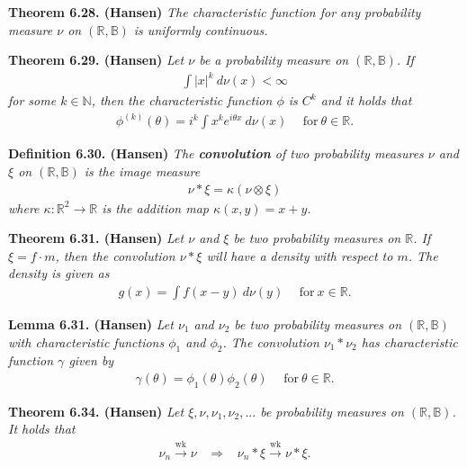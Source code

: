 \documentclass[a4paper,12pt,openany]{book}
\begin{document}
\textbf{Theorem 6.28. (Hansen)} \emph{The characteristic function for any probability measure \(\nu\) on \((\mathbb{R},\mathbb{B})\) is uniformly continuous.}

\textbf{Theorem 6.29. (Hansen)} \emph{Let \(\nu\) be a probability measure on \((\mathbb{R},\mathbb{B})\). If}
\begin{align*}
    \int \vert x\vert^k\ d\nu(x)<\infty
\end{align*}
\emph{for some \(k\in\mathbb{N}\), then the characteristic function \(\phi\) is \(C^k\) and it holds that}
\begin{align*}
    \phi^{(k)}(\theta)=i^k\int x^ke^{i\theta x}\ d\nu(x)\hspace{15pt}\text{for}\ \theta\in\mathbb{R}.\tag{6.31}
\end{align*}

\textbf{Definition 6.30. (Hansen)} \emph{The \textbf{convolution} of two probability measures \(\nu\) and \(\xi\) on \((\mathbb{R},\mathbb{B})\) is the image measure}
\begin{align*}
    \nu * \xi=\kappa (\nu\otimes\xi)\tag{6.33}
\end{align*}
\emph{where \(\kappa : \mathbb{R}^2\to\mathbb{R}\) is the addition map \(\kappa(x,y)=x+y\).}

\textbf{Theorem 6.31. (Hansen)} \emph{Let \(\nu\) and \(\xi\) be two probability measures on \(\mathbb{R}\). If \(\xi=f\cdot m\), then the convolution \(\nu*\xi\) will have a density with respect to \(m\). The density is given as}
\begin{align*}
    g(x)=\int f(x-y)\ d\nu(y)\hspace{15pt}\text{for}\ x\in\mathbb{R}.\tag{6.35}
\end{align*}

\textbf{Lemma 6.31. (Hansen)} \emph{Let \(\nu_1\) and \(\nu_2\) be two probability measures on \((\mathbb{R},\mathbb{B})\) with characteristic functions \(\phi_1\) and \(\phi_2\). The convolution \(\nu_1*\nu_2\) has characteristic function \(\gamma\) given by}
\begin{align*}
    \gamma(\theta)=\phi_1(\theta)\phi_2(\theta)\hspace{15pt}\text{for}\ \theta\in\mathbb{R}.\tag{6.37}
\end{align*}

\textbf{Theorem 6.34. (Hansen)} \emph{Let \(\xi,\nu,\nu_1,\nu_2,...\) be probability measures on \((\mathbb{R},\mathbb{B})\). It holds that}
\begin{align*}
    \nu_n\stackrel{\text{wk}}{\to} \nu\hspace{10pt}\Rightarrow\hspace{10pt} \nu_n*\xi\stackrel{\text{wk}}{\to} \nu *\xi.
\end{align*}
\end{document}
